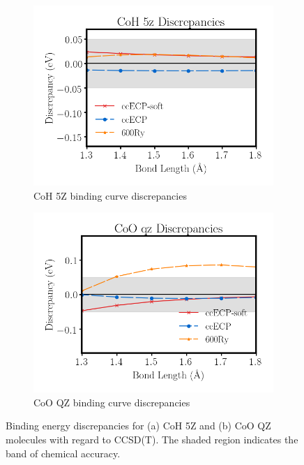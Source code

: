 \begin{figure}[!htbp]
\centering
\begin{subfigure}{0.5\textwidth}
\includegraphics[width=\textwidth]{figures/CoH_5z.png}
\caption{CoH 5Z binding curve discrepancies}
\label{fig:CoO_5z}
\end{subfigure}%
\begin{subfigure}{0.5\textwidth}
\includegraphics[width=\textwidth]{figures/CoO_qz.png}
\caption{CoO QZ binding curve discrepancies}
\label{fig:CoO_qz}
\end{subfigure}
\caption{Binding energy discrepancies for (a) CoH 5Z and (b) CoO QZ molecules with regard to CCSD(T). The shaded region indicates the band of chemical accuracy. }%
\label{fig:Co_mols}
\end{figure}



